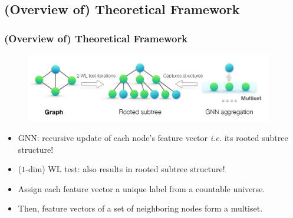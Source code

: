 \documentclass{beamer}
\begin{document}
\subsection{(Overview of) Theoretical Framework}

\begin{frame}
\frametitle{(Overview of) Theoretical Framework}

\begin{figure}[hbt]
	\includegraphics[height=3cm]{fig2.png}
\end{figure}

\begin{itemize}
    \item GNN: recursive update of each node's feature vector {\it i.e.} its rooted subtree structure! \pause
    
    \item ($1$-dim) WL test: also results in rooted subtree structure! \pause
    
    \item Assign each feature vector a unique label from a countable universe. \pause
    
    \item Then, feature vectors of a set of neighboring nodes form a \alert{multiset}.
\end{itemize}
\end{frame}
\end{document}
